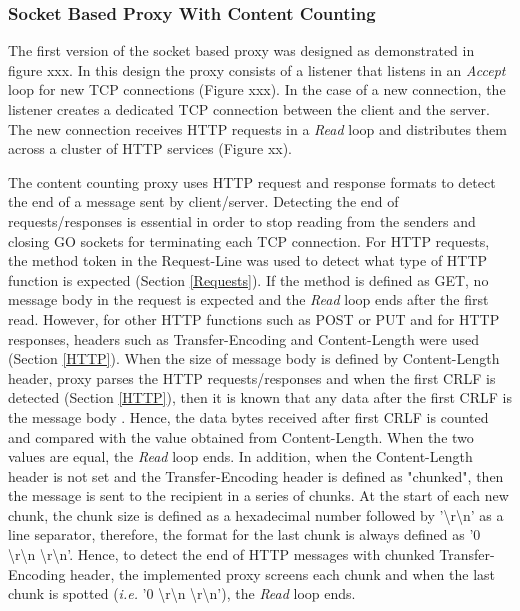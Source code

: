 \documentclass[a4paper,11pt,twoside]{article}
\begin{document}
\subsubsection{Socket Based Proxy With Content Counting}\label{Content-Counting}
The first version of the socket based proxy was designed as demonstrated in figure xxx. In this design the proxy consists of a listener that listens in an  \textit{Accept} loop for new TCP connections (Figure xxx). In the case of a new connection, the listener creates a dedicated TCP connection between the client and the server. The new connection receives HTTP requests in a  \textit{Read} loop and distributes them across a cluster of HTTP services (Figure xx).  

The content counting proxy uses HTTP request and response formats to detect the end of a message sent by client/server. Detecting the end of requests/responses is essential in order to stop reading from the senders and closing GO sockets for terminating each TCP connection. For HTTP requests, the method token in the Request-Line was used to detect what type of HTTP function is expected (Section \ref{Requests}). If the method is defined as GET, no message body in the request is expected and the  \textit{Read} loop ends after the first read. However, for other HTTP functions such as POST or PUT and for HTTP responses, headers such as Transfer-Encoding and Content-Length were used (Section \ref{HTTP}). When the size of message body is defined by Content-Length header, proxy parses the HTTP requests/responses and when the first CRLF is detected (Section \ref{HTTP}), then it is known that any data after the first CRLF is the message body . Hence, the data bytes received after first CRLF is counted and compared with the value obtained from Content-Length. When the two values are equal, the \textit{Read} loop ends. In addition, when the Content-Length header is not set and the Transfer-Encoding header is defined as "chunked", then the message is sent to the recipient in a series of chunks. At the start of each new chunk, the chunk size is defined as a hexadecimal number followed by '\textbackslash r\textbackslash n' as a line separator, therefore, the format for the last chunk is always defined as '0 \textbackslash r\textbackslash n \textbackslash r\textbackslash n'. Hence, to detect the end of HTTP messages with chunked Transfer-Encoding header, the implemented proxy screens each chunk and when the last chunk is spotted (\textit{i.e.} '0 \textbackslash r\textbackslash n \textbackslash r\textbackslash n'), the  \textit{Read} loop ends. 
\end{document}
